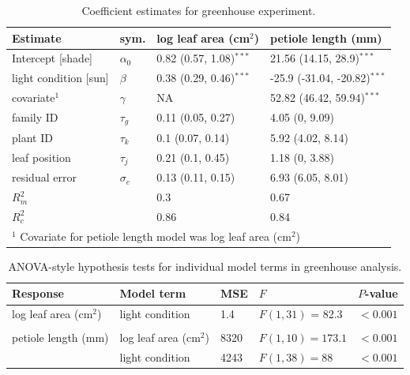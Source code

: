 \documentclass[11pt, oneside]{amsart}
\begin{document}
\begin{table}[!h]
\small
\caption{Coefficient estimates for greenhouse experiment.}
\centering
\begin{tabular}{llll}
\toprule
Estimate & sym. & log leaf area (cm$^2$) & petiole length (mm)\\
\midrule
Intercept [shade] & $\alpha_0$ & 0.82 (0.57, 1.08)$^{***}$ & 21.56 (14.15, 28.9)$^{***}$\\
light condition [sun] & $\beta$ & 0.38 (0.29, 0.46)$^{***}$ & -25.9 (-31.04, -20.82)$^{***}$\\
covariate$^1$ & $\gamma$ & NA & 52.82 (46.42, 59.94)$^{***}$\\
family ID & $\tau_g$ & 0.11 (0.05, 0.27) & 4.05 (0, 9.09)\\
plant ID & $\tau_k$ & 0.1 (0.07, 0.14) & 5.92 (4.02, 8.14)\\
leaf position & $\tau_j$ & 0.21 (0.1, 0.45) & 1.18 (0, 3.88)\\
residual error & $\sigma_{e}$ & 0.13 (0.11, 0.15) & 6.93 (6.05, 8.01)\\
$R^2_m$ & & 0.3 & 0.67\\
$R^2_c$ & & 0.86 & 0.84\\
\bottomrule
\multicolumn{4}{l}{$^1$ Covariate for petiole length model was log leaf area (cm$^2$)}
\end{tabular}
\label{tableS7}
\end{table}

\vspace{2cm}

\begin{table}[!h]
\small
\caption{ANOVA-style hypothesis tests for individual model terms in greenhouse analysis.}
\centering
\begin{tabular}{lllll}
\toprule
Response & Model term & MSE & $F$ & $P$-value\\
\midrule
log leaf area (cm$^2$) & light condition & 1.4 & $F(1,31)$ = 82.3 & $<0.001$\\
 &  &  &  & \\
petiole length (mm) & log leaf area (cm$^2$) & 8320 & $F(1,10) = 173.1$ & $<0.001$\\
 & light condition & 4243 & $F(1,38) = 88$ & $<0.001$\\
\bottomrule
\end{tabular}
\label{tableS8}
\end{table}

\vspace{2cm}
\end{document}
